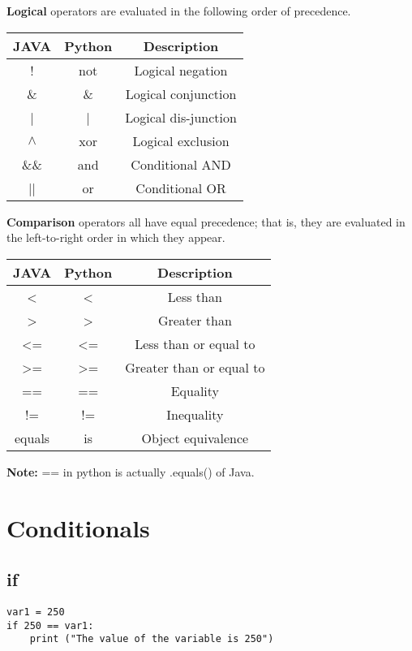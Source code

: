\documentclass[a4paper,9pt]{extarticle}
\begin{document}
\begin{multicols*}{2}
\textbf{Logical} operators are evaluated in the following order of precedence.

\begin{center}
 \begin{tabular}{||c | c | c||}
 \hline
 \textbf{JAVA} & \textbf{Python} & \textbf{Description}\\ [1ex]
 \hline\hline
  ! & not & Logical negation\\
 \hline
 \&  & \& & Logical conjunction\\
 \hline
 | & | & Logical dis-junction\\
 \hline
 $\wedge$ & xor & Logical exclusion \\
 \hline
  \&\& & and & Conditional AND\\
 \hline
  || & or & Conditional OR\\
 \hline
\end{tabular}
\end{center}

\textbf{Comparison} operators all have equal precedence; that is, they are evaluated in the left-to-right order in which they appear.

\begin{center}
 \begin{tabular}{||c | c | c||}
 \hline
 \textbf{JAVA} & \textbf{Python} & \textbf{Description}\\ [1ex]
 \hline\hline
 < & < & Less than\\
 \hline
 > & > & Greater than\\
 \hline
 <= & <= & Less than or equal to \\
 \hline
  >= & >= & Greater than or equal to\\
 \hline
  == & == & Equality\\
 \hline
 != & != & Inequality\\
 \hline
 equals & is & Object equivalence \\
 \hline
\end{tabular}
\end{center}
\textbf{Note: } == in python is actually .equals() of Java.
\vspace{5 mm}

\section{Conditionals}
\subsection{if}
\begin{lstlisting}
var1 = 250
if 250 == var1:
    print ("The value of the variable is 250")
\end{lstlisting}
\vspace{5 mm}


\end{multicols*}
\end{document}
